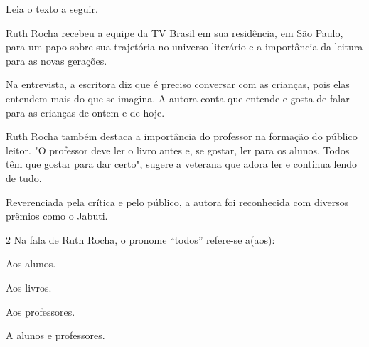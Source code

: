 Leia o texto a seguir.

\begin{myquote}
\noindent Ruth Rocha recebeu a equipe da TV Brasil em sua residência, em São
Paulo, para um papo sobre sua trajetória no universo literário e a
importância da leitura para as novas gerações.

Na entrevista, a escritora diz que é preciso conversar com as crianças,
pois elas entendem mais do que se imagina. A autora conta que entende e
gosta de falar para as crianças de ontem e de hoje.

Ruth Rocha também destaca a importância do professor na formação do
público leitor. "O professor deve ler o livro antes e, se gostar, ler
para os alunos. Todos têm que gostar para dar certo", sugere a veterana
que adora ler e continua lendo de tudo.

Reverenciada pela crítica e pelo público, a autora foi reconhecida com
diversos prêmios como o Jabuti.

\end{myquote}

\num{2} Na fala de Ruth Rocha, o pronome ``todos'' refere-se a(aos):

\begin{escolha}
\item Aos alunos.
\item Aos livros.
\item Aos professores.
\item A alunos e professores.
\end{escolha}



